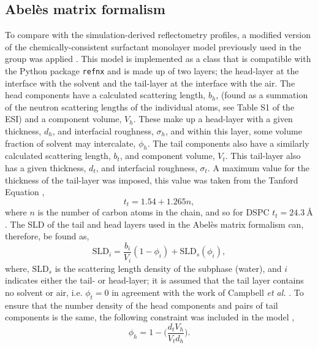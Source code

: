 \documentclass[amsmath,amssymb,twocolumn,superscriptaddress]{revtex4-1}
\begin{document}
\subsection{Abel\`{e}s matrix formalism}
To compare with the simulation-derived reflectometry profiles, a modified version of the chemically-consistent surfactant monolayer model previously used in the group was applied \cite{mccluskey_bayesian_2019,mccluskey_lipids_at_airdes_2019}.
This model is implemented as a class that is compatible with the Python package \texttt{refnx} \cite{nelson_refnx_2019,nelson_refnx_2018} and is made up of two layers; the head-layer at the interface with the solvent and the tail-layer at the interface with the air.
The head components have a calculated scattering length, $b_h$, (found as a summation of the neutron scattering lengths of the individual atoms, see Table S1 of the ESI) and a component volume, $V_h$.
These make up a head-layer with a given thickness, $d_h$, and interfacial roughness, $\sigma_h$, and within this layer, some volume fraction of solvent may intercalate, $\phi_h$.
The tail components also have a similarly calculated scattering length, $b_t$, and component volume, $V_t$.
This tail-layer also has a given thickness, $d_t$, and interfacial roughness, $\sigma_t$.
A maximum value for the thickness of the tail-layer was imposed, this value was taken from the Tanford Equation \cite{tanford_hydrophobic_1980},
%
\begin{equation}
  t_t = 1.54 + 1.265n,
\end{equation}
%
where $n$ is the number of carbon atoms in the chain, and so for DSPC $t_t = \SI{24.3}{\angstrom}$.
The SLD of the tail and head layers used in the Abel\`{e}s matrix formalism can, therefore, be found as,
%
\begin{equation}
  \text{SLD}_i = \frac{b_i}{V_i}(1 - \phi_i) + \text{SLD}_s(\phi_i),
\end{equation}
%
where, $\text{SLD}_s$ is the scattering length density of the subphase (water), and $i$ indicates either the tail- or head-layer; it is assumed that the tail layer contains no solvent or air, i.e. $\phi_t = 0$ in agreement with the work of Campbell \emph{et al.} \cite{campbell_structure_2018}.
To ensure that the number density of the head components and pairs of tail components is the same, the following constraint was included in the model \cite{braun_polymers_2017},
%
\begin{equation}
  \phi_h = 1 - \bigg(\frac{d_tV_h}{V_td_h}\bigg).
\end{equation}
\end{document}
